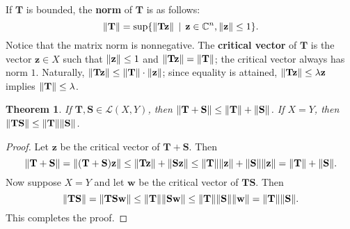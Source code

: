 \documentclass[11pt]{article}
\newtheorem{theorem}{Theorem}
\renewcommand{\vec}[1]{\mathbf{#1}}
\newcommand{\mat}[1]{\mathbf{#1}}
\begin{document}
If $\mat{T}$ is bounded, the \textbf{norm} of $\mat{T}$ is as follows:
\[
	\norm{\mat{T}} = \sup \{ \norm{\mat{T} \vec{z}} \, \mid \, \vec{z} \in \mathbb{C}^{n}, \norm{\vec{z}} \le 1\}.
\]
Notice that the matrix norm is nonnegative. The \textbf{critical vector} of $\mat{T}$ is the vector $\vec{z} \in X$ such that $\norm{\vec{z}} \le 1$ and $\norm{\mat{T} \vec{z}} = \norm{\mat{T}}$; the critical vector always has norm $1$. Naturally, $\norm{\mat{T} \vec{z}} \le \norm{\mat{T}} \cdot \norm{\vec{z}}$; since equality is attained, $\norm{\mat{T} \vec{z}} \le \lambda \vec{z}$ implies $\norm{\vec{T}} \le \lambda$.

\begin{theorem}
	If $\mat{T}, \mat{S} \in \mathcal{L}(X, Y)$, then $\norm{\mat{T} + \mat{S}} \le \norm{\mat{T}} + \norm{\mat{S}}$. If $X = Y$, then $\norm{\mat{TS}} \le \norm{\mat{T}} \norm{\mat{S}}$.
\end{theorem}
\begin{adjustwidth}{0.5cm}{}
	\begin{proof}
		Let $\vec{z}$ be the critical vector of $\mat{T} + \mat{S}$. Then
		\[
			\norm{\mat{T} + \mat{S}} = \norm{(\mat{T} + \mat{S})\vec{z}} \le \norm{\mat{T} \vec{z}} + \norm{\mat{S} \vec{z}} \le \norm{\mat{T}} \norm{\vec{z}} + \norm{\mat{S}} \norm{\vec{z}} = \norm{\mat{T}} + \norm{\mat{S}}.
		\]
		Now suppose $X = Y$ and let $\vec{w}$ be the critical vector of $\mat{TS}$. Then
		\[
			\norm{\mat{TS}} = \norm{\mat{TS} \vec{w}} \le \norm{\mat{T}} \norm{\mat{S} \vec{w}} \le \norm{\mat{T}} \norm{\mat{S}} \norm{\vec{w}} = \norm{\mat{T}} \norm{\mat{S}}.
		\]
		This completes the proof.
	\end{proof}
\end{adjustwidth}
\end{document}
